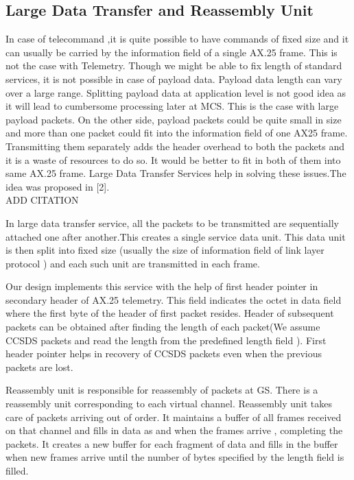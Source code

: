 \documentclass[BTech]{iitmdiss}
\begin{document}
\subsection{Large Data Transfer and Reassembly Unit}
In case of telecommand ,it is quite possible to have commands of fixed size and it can usually be carried by the information field of a single AX.25 frame. This is not the case with Telemetry. Though we might be able to fix length of standard services, it is not possible in case of payload data. Payload data length can vary over a large range. Splitting payload data at application level is not good idea as it will lead to cumbersome processing later at MCS. This is the case with large payload packets. On the other side, payload packets could be quite small in size and more than one packet could fit into the information field of one AX25 frame. Transmitting them separately adds the header overhead to both the packets and it is  a waste of resources to do so. It would be better to fit in both of them into same AX.25 frame. Large Data Transfer Services help in solving these issues.The idea was proposed in [2].
\\ ADD CITATION \\
\par In large data transfer service, all the packets to be transmitted are sequentially attached one after another.This creates a single service data unit. This data unit is then split into fixed size (usually the size of information field of link layer protocol ) and each such unit are transmitted in each frame. 
\par Our design implements this service with the help of first header pointer in secondary header of AX.25 telemetry. This field indicates the octet in data field where the first byte of the header of first packet resides. Header of subsequent packets can be obtained after finding the length of each packet(We assume CCSDS packets and read the length from the predefined length field ). First header pointer helps in recovery of CCSDS packets even when the previous packets are lost. 
\par Reassembly unit is responsible for reassembly of packets at GS. There is a reassembly unit corresponding to each virtual channel. Reassembly unit takes care of packets arriving out of order. It maintains a buffer of all frames received on that channel and fills in data as and when the frames arrive , completing the packets. It creates a new buffer for each fragment of data and fills in the buffer when new frames arrive until the number of bytes specified by the length field is filled.
\end{document}
